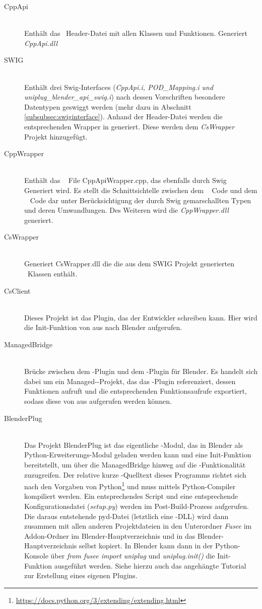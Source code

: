 \begin{description}
\item[CppApi]\hfill \\
Enthält das \CC~Header-Datei mit allen Klassen und Funktionen. Generiert \emph{CppApi.dll}
\item[SWIG]\hfill \\
Enthält drei Swig-Interfaces (\emph{CppApi.i, POD\_Mapping.i und \\
uniplug\_blender\_api\_swig.i}) nach dessen Vorschriften besondere Datentypen geswiggt werden (mehr dazu in Abschnitt \ref{subsubsec:swiginterface}). Anhand der Header-Datei werden die entsprechenden Wrapper in \CS generiert. Diese werden dem \emph{CsWrapper} Projekt hinzugefügt.
\item[CppWrapper]\hfill \\
Enthält das \CC~ File CppApiWrapper.cpp, das ebenfalls durch Swig Generiert wird. Es stellt die Schnittsichtelle zwischen dem \CC~ Code und dem \CS~ Code dar unter Berücksichtigung der durch Swig gemarschallten Typen und deren Umwandlungen. Des Weiteren wird die \emph{CppWrapper.dll} generiert.
\item[CsWrapper]\hfill \\
Generiert CsWrapper.dll die die aus dem SWIG Projekt generierten \CS~Klassen enthält. 
\item[CsClient]\hfill \\
Dieses Projekt ist das Plugin, das der Entwickler schreiben kann. Hier wird die Init-Funktion von \CS aus nach Blender aufgerufen.
\item[ManagedBridge]\hfill \\ Brücke zwischen dem \CS-Plugin und dem \CC-Plugin für Blender. Es handelt sich dabei um ein Managed-\CC-Projekt, das das \CS-Plugin referenziert, dessen Funktionen aufruft und die entsprechenden Funktionsaufrufe exportiert, sodass diese von \CC aus aufgerufen werden können.
\item[BlenderPlug]\hfill \\ Das Projekt BlenderPlug ist das eigentliche \CC-Modul, das in Blender als Python-Erweiterungs-Modul geladen werden kann und eine Init-Funktion bereitstellt, um über die ManagedBridge hinweg auf die \CS{}-Funktionalität zuzugreifen. Der relative kurze \CC-Quelltext dieses Programms richtet sich nach den Vorgaben von Python\footnote{\url{https://docs.python.org/3/extending/extending.html}} und muss mittels Python-Compiler kompiliert werden. Ein entsprechendes Script und eine entsprechende Konfigurationsdatei (\emph{setup.py}) werden im Post-Build-Prozess aufgerufen. Die daraus entstehende pyd-Datei (letztlich eine \CC-DLL) wird dann zusammen mit allen anderen Projektdateien in den Unterordner \emph{Fusee} im Addon-Ordner im Blender-Hauptverzeichnis und in das Blender-Hauptverzeichnis selbst kopiert. In Blender kann dann in der Python-Konsole über \emph{from fusee import uniplug} und \emph{uniplug.init()} die Init-Funktion ausgeführt werden. Siehe hierzu auch das angehängte Tutorial zur Erstellung eines eigenen Plugins.
\end{description}

